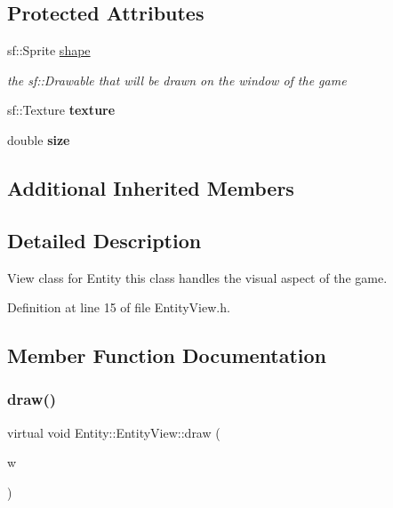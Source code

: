 \subsection*{Protected Attributes}
\begin{DoxyCompactItemize}
\item 
\mbox{\label{classEntity_1_1EntityView_aea3dd9f085ae1f822dc943b9eeea0928}} 
sf\+::\+Sprite \hyperlink{classEntity_1_1EntityView_aea3dd9f085ae1f822dc943b9eeea0928}{shape}
\begin{DoxyCompactList}\small\item\em the sf\+::\+Drawable that will be drawn on the window of the game \end{DoxyCompactList}\item 
\mbox{\label{classEntity_1_1EntityView_ab3cc599da3c954d469c2092611f369ab}} 
sf\+::\+Texture {\bfseries texture}
\item 
\mbox{\label{classEntity_1_1EntityView_a0cf3f32c7fa991f38a6b16fcc2db6fdf}} 
double {\bfseries size}
\end{DoxyCompactItemize}
\subsection*{Additional Inherited Members}


\subsection{Detailed Description}
View class for Entity this class handles the visual aspect of the game. 

Definition at line 15 of file Entity\+View.\+h.



\subsection{Member Function Documentation}
\mbox{\label{classEntity_1_1EntityView_a9a415b467798f8bbb9cd2489c3edd941}} 
\subsubsection{\texorpdfstring{draw()}{draw()}}
{\footnotesize\ttfamily virtual void Entity\+::\+Entity\+View\+::draw (\begin{DoxyParamCaption}\item[{sf\+::\+Render\+Window \&}]{w }\end{DoxyParamCaption})\hspace{0.3cm}{\ttfamily [pure virtual]}}



